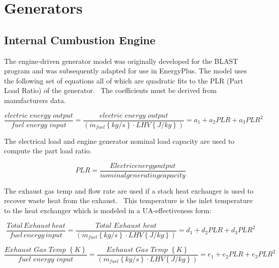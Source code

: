 \section{Generators}\label{generators}

\subsection{Internal Cumbustion Engine}\label{internal-cumbustion-engine}

The engine-driven generator model was originally developed for the BLAST program and was subsequently adapted for use in EnergyPlus. The model uses the following set of equations all of which are quadratic fits to the PLR (Part Load Ratio) of the generator.~ The coefficients must be derived from manufacturers data.

\begin{equation}
\frac{{electric\,\,energy\,\,output}}{{fuel\,\,energy\,\,input}} = \frac{{electric\,\,energy\,\,output}}{{\left( {{{\dot m}_{fuel}}\left\{ {kg/s} \right\} \cdot LHV\left\{ {J/kg} \right\}} \right)}} = {a_1} + {a_2}PLR + {a_3}PL{R^2}
\end{equation}

The electrical load and engine generator nominal load capacity are used to compute the part load ratio.

\begin{equation}
PLR = \frac{{Electric energy output}}{{nominal generating capacity}}
\end{equation}

The exhaust gas temp and flow rate are used if a stack heat exchanger is used to recover waste heat from the exhaust.~ This temperature is the inlet temperature to the heat exchanger which is modeled in a UA-effectiveness form:

\begin{equation}
\frac{{Total\,Exhaust\,heat}}{{fuel\,energy\,input}} = \frac{{Total\,\,Exhaust\,\,heat}}{{\left( {{{\dot m}_{fuel}}\left\{ {kg/s} \right\} \cdot LHV\left\{ {J/kg} \right\}} \right)}} = {d_1} + {d_2}PLR + {d_3}PL{R^2}
\end{equation}

\begin{equation}
\frac{{Exhaust\,\,Gas\,\,Temp\,\,\left\{ K \right\}}}{{fuel\,\,energy\,\,input}} = \frac{{Exhaust\,\,Gas\,\,Temp\,\,\left\{ K \right\}}}{{\left( {{{\dot m}_{fuel}}\left\{ {kg/s} \right\} \cdot LHV\left\{ {J/kg} \right\}} \right)}} = {e_1} + {e_2}PLR + {e_3}PL{R^2}
\end{equation}

